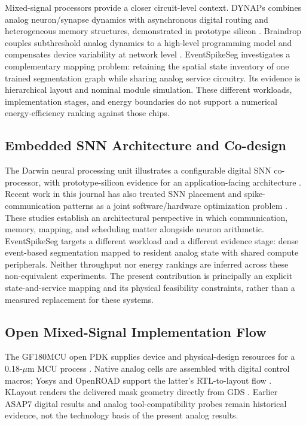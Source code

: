\documentclass[preprint,12pt,number]{elsarticle}
\begin{document}
Mixed-signal processors provide a closer circuit-level context. DYNAPs combines analog neuron/synapse dynamics with asynchronous digital routing and heterogeneous memory structures, demonstrated in prototype silicon \cite{moradi2018dynaps}. Braindrop couples subthreshold analog dynamics to a high-level programming model and compensates device variability at network level \cite{neckar2019braindrop}. EventSpikeSeg investigates a complementary mapping problem: retaining the spatial state inventory of one trained segmentation graph while sharing analog service circuitry. Its evidence is hierarchical layout and nominal module simulation. These different workloads, implementation stages, and energy boundaries do not support a numerical energy-efficiency ranking against those chips.

\subsection{Embedded SNN Architecture and Co-design}
The Darwin neural processing unit illustrates a configurable digital SNN co-processor, with prototype-silicon evidence for an application-facing architecture \cite{ma2017darwin}. Recent work in this journal has also treated SNN placement and spike-communication patterns as a joint software/hardware optimization problem \cite{xiao2025codesign}. These studies establish an architectural perspective in which communication, memory, mapping, and scheduling matter alongside neuron arithmetic. EventSpikeSeg targets a different workload and a different evidence stage: dense event-based segmentation mapped to resident analog state with shared compute peripherals. Neither throughput nor energy rankings are inferred across these non-equivalent experiments. The present contribution is principally an explicit state-and-service mapping and its physical feasibility constraints, rather than a measured replacement for these systems.

\subsection{Open Mixed-Signal Implementation Flow}
The GF180MCU open PDK supplies device and physical-design resources for a 0.18-$\mu$m MCU process \cite{gf180pdk}. Native analog cells are assembled with digital control macros; Yosys and OpenROAD support the latter's RTL-to-layout flow \cite{ajayi2019openroad}. KLayout renders the delivered mask geometry directly from GDS \cite{klayout}. Earlier ASAP7 digital results and analog tool-compatibility probes \cite{clark2016asap7,vashishtha2017asap7} remain historical evidence, not the technology basis of the present analog results.
\end{document}
